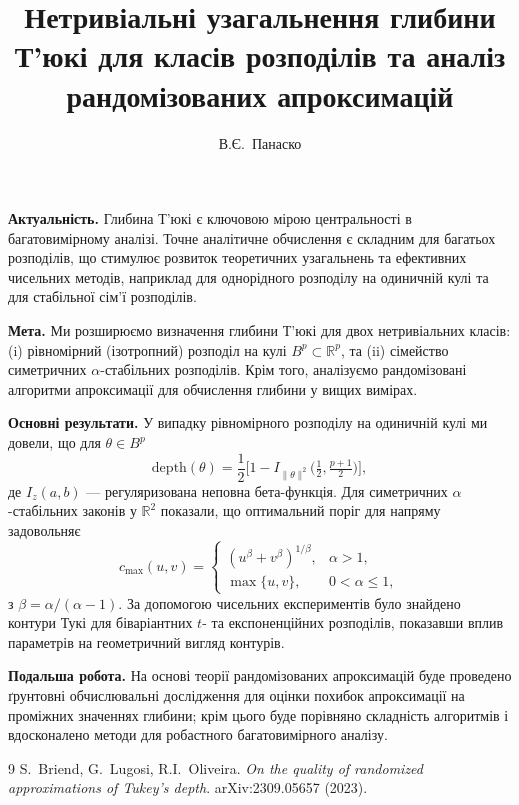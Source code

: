 \documentclass[10pt,reqno]{amsart}
\newcommand{\R}{\mathbb{R}}
\newcommand{\1}{1\mkern-4.5mu\mathrm{l}}
\begin{document}
\title{Нетривіальні узагальнення глибини Т'юкі для класів розподілів та аналіз рандомізованих апроксимацій}

\author{В.Є.~Панаско}
\address{КПІ ім. Ігоря Сікорського, Київ, Україна}

\makeatletter\def\and{\unskip,\;\space\ignorespaces}\def\author@andify{\nxandlist{\and}{\and}{\and}}\makeatother
\maketitle\pagestyle{empty}\thispagestyle{empty}

\textbf{Актуальність.} Глибина Т'юкі є ключовою мірою центральності в багатовимірному аналізі. Точне аналітичне обчислення є складним для багатьох розподілів, що стимулює розвиток теоретичних узагальнень та ефективних чисельних методів, наприклад для однорідного розподілу на одиничній кулі та для стабільної сім'ї розподілів.

\medskip

\textbf{Мета.} Ми розширюємо визначення глибини Т'юкі для двох нетривіальних класів: (i) рівномірний (ізотропний) розподіл на кулі $B^p\subset\R^p$, та (ii) сімейство симетричних $\alpha$-стабільних розподілів. Крім того, аналізуємо рандомізовані алгоритми апроксимації для обчислення глибини у вищих вимірах.

\medskip

\textbf{Основні результати.} У випадку рівномірного розподілу на одиничній кулі ми довели, що для $\theta\in B^p$
\[
\mathrm{depth}(\theta)
=\frac12\bigl[1 - I_{\|\theta\|^2}\bigl(\tfrac12,\tfrac{p+1}2\bigr)\bigr],
\]
де $I_z(a,b)$ — регуляризована неповна бета-функція. Для симетричних $\alpha$-стабільних законів у $\R^2$ показали, що оптимальний поріг для напряму задовольняє
\[
c_{\max}(u,v)=
\begin{cases}
(u^\beta+v^\beta)^{1/\beta}, &\alpha>1,\\
\max\{u,v\}, &0<\alpha\le1,
\end{cases}
\]
з $\beta=\alpha/(\alpha-1)$. За допомогою чисельних експериментів було знайдено контури Тукі для біваріантних $t$- та експоненційних розподілів, показавши вплив параметрів на геометричний вигляд контурів.

\medskip

\textbf{Подальша робота.} На основі теорії рандомізованих апроксимацій \cite{briend2023quality} буде проведено ґрунтовні обчислювальні дослідження для оцінки похибок апроксимації на проміжних значеннях глибини; крім цього буде порівняно складність алгоритмів і вдосконалено методи для робастного багатовимірного аналізу.

\begin{thebibliography}{9}
   S.~Briend, G.~Lugosi, R.I.~Oliveira. \emph{On the quality of randomized approximations of Tukey's depth}. arXiv:2309.05657 (2023).
\end{thebibliography}
\end{document}
